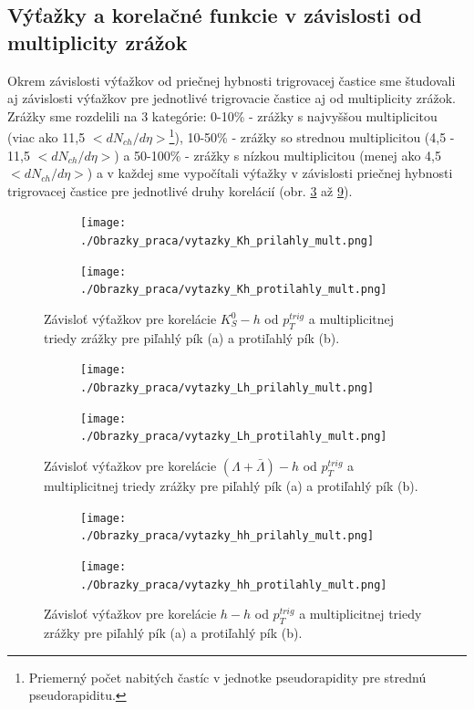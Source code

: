 \documentclass[thesismargins, thesislinespacing]{rnthesis}
\begin{document}
\subsection{Výťažky a korelačné funkcie v závislosti od multiplicity zrážok}
Okrem závislosti výťažkov od priečnej hybnosti trigrovacej častice sme študovali aj závislosti výťažkov pre jednotlivé trigrovacie častice aj od multiplicity zrážok. Zrážky sme rozdelili na 3 kategórie: 0-10\% - zrážky s najvyššou multiplicitou (viac ako 11,5 $<dN_{ch}/d\eta>$\footnote{Priemerný počet nabitých častíc v jednotke pseudorapidity pre strednú pseudorapiditu.}), 10-50\% - zrážky so strednou multiplicitou (4,5 - 11,5 $<dN_{ch}/d\eta>$) a 50-100\% - zrážky s nízkou multiplicitou (menej ako 4,5 $<dN_{ch}/d\eta>$) a v každej sme vypočítali výťažky v závislosti priečnej hybnosti trigrovacej častice pre jednotlivé druhy korelácií (obr. \ref{K0mult} až \ref{hhmult}).
\begin{figure}
	\centering
	\begin{subfigure}{0.5\textwidth}
		\centering
		\texttt{[image: ./Obrazky\_praca/vytazky\_Kh\_prilahly\_mult.png]}
		\caption{}
		\label{K0pril}
	\end{subfigure}%
	\begin{subfigure}{0.5\textwidth}
		\centering
		\texttt{[image: ./Obrazky\_praca/vytazky\_Kh\_protilahly\_mult.png]}
		\caption{}
		\label{K0proti}
	\end{subfigure}
	\caption{Závisloť výťažkov pre korelácie $K^0_S - h$ od $p_T^{trig}$ a multiplicitnej triedy zrážky pre piľahlý pík (a) a protiľahlý pík (b).}
	\label{K0mult}
\end{figure}
\begin{figure}
	\centering
	\begin{subfigure}{0.5\textwidth}
		\centering
		\texttt{[image: ./Obrazky\_praca/vytazky\_Lh\_prilahly\_mult.png]}
		\caption{}
		\label{Lampril}
	\end{subfigure}%
	\begin{subfigure}{0.5\textwidth}
		\centering
		\texttt{[image: ./Obrazky\_praca/vytazky\_Lh\_protilahly\_mult.png]}
		\caption{}
		\label{Lamproti}
	\end{subfigure}
	\caption{Závisloť výťažkov pre korelácie $(\Lambda + \bar{\Lambda})- h$ od $p_T^{trig}$ a multiplicitnej triedy zrážky pre piľahlý pík (a) a protiľahlý pík (b).}
	\label{Lammult}
\end{figure}
\begin{figure}
	\centering
	\begin{subfigure}{0.5\textwidth}
		\centering
		\texttt{[image: ./Obrazky\_praca/vytazky\_hh\_prilahly\_mult.png]}
		\caption{}
		\label{hhpril}
	\end{subfigure}%
	\begin{subfigure}{0.5\textwidth}
		\centering
		\texttt{[image: ./Obrazky\_praca/vytazky\_hh\_protilahly\_mult.png]}
		\caption{}
		\label{hhproti}
	\end{subfigure}
	\caption{Závisloť výťažkov pre korelácie $h - h$ od $p_T^{trig}$ a multiplicitnej triedy zrážky pre piľahlý pík (a) a protiľahlý pík (b).}
	\label{hhmult}
\end{figure}
\end{document}
